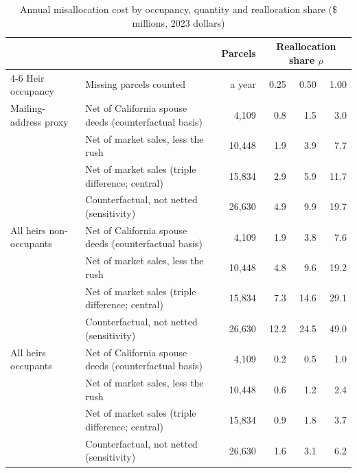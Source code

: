 \begin{table}[!ht]\centering
\caption{Annual misallocation cost by occupancy, quantity and reallocation share (\$ millions, 2023 dollars)}\label{tab:welfare_grid}
{\small\setlength{\tabcolsep}{5pt}
\begin{tabular}{lp{5.6cm}rrrr}\toprule
 & & Parcels & \multicolumn{3}{c}{Reallocation share $\rho$} \\
\cmidrule(lr){4-6}
Heir occupancy & Missing parcels counted & a year & 0.25 & 0.50 & 1.00 \\\midrule
Mailing-address proxy & Net of California spouse deeds (counterfactual basis) & 4,109 & 0.8 & 1.5 & 3.0 \\
 & Net of market sales, less the rush & 10,448 & 1.9 & 3.9 & 7.7 \\
 & Net of market sales (triple difference; central) & 15,834 & 2.9 & 5.9 & 11.7 \\
 & Counterfactual, not netted (sensitivity) & 26,630 & 4.9 & 9.9 & 19.7 \\
\addlinespace
All heirs non-occupants & Net of California spouse deeds (counterfactual basis) & 4,109 & 1.9 & 3.8 & 7.6 \\
 & Net of market sales, less the rush & 10,448 & 4.8 & 9.6 & 19.2 \\
 & Net of market sales (triple difference; central) & 15,834 & 7.3 & 14.6 & 29.1 \\
 & Counterfactual, not netted (sensitivity) & 26,630 & 12.2 & 24.5 & 49.0 \\
\addlinespace
All heirs occupants & Net of California spouse deeds (counterfactual basis) & 4,109 & 0.2 & 0.5 & 1.0 \\
 & Net of market sales, less the rush & 10,448 & 0.6 & 1.2 & 2.4 \\
 & Net of market sales (triple difference; central) & 15,834 & 0.9 & 1.8 & 3.7 \\
 & Counterfactual, not netted (sensitivity) & 26,630 & 1.6 & 3.1 & 6.2 \\
\bottomrule\end{tabular}}

\end{table}
